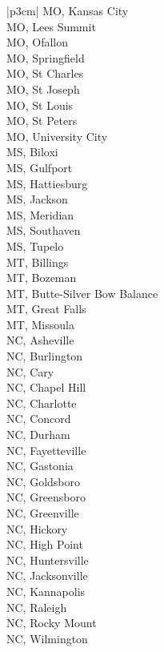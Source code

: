 \begin{customLongTable}{ |p{3cm}| }
MO, Kansas City \\ \hline
MO, Lees Summit \\ \hline
MO, Ofallon \\ \hline
MO, Springfield \\ \hline
MO, St Charles \\ \hline
MO, St Joseph \\ \hline
MO, St Louis \\ \hline
MO, St Peters \\ \hline
MO, University City \\ \hline
MS, Biloxi \\ \hline
MS, Gulfport \\ \hline
MS, Hattiesburg \\ \hline
MS, Jackson \\ \hline
MS, Meridian \\ \hline
MS, Southaven \\ \hline
MS, Tupelo \\ \hline
MT, Billings \\ \hline
MT, Bozeman \\ \hline
MT, Butte-Silver Bow Balance \\ \hline
MT, Great Falls \\ \hline
MT, Missoula \\ \hline
NC, Asheville \\ \hline
NC, Burlington \\ \hline
NC, Cary \\ \hline
NC, Chapel Hill \\ \hline
NC, Charlotte \\ \hline
NC, Concord \\ \hline
NC, Durham \\ \hline
NC, Fayetteville \\ \hline
NC, Gastonia \\ \hline
NC, Goldsboro \\ \hline
NC, Greensboro \\ \hline
NC, Greenville \\ \hline
NC, Hickory \\ \hline
NC, High Point \\ \hline
NC, Huntersville \\ \hline
NC, Jacksonville \\ \hline
NC, Kannapolis \\ \hline
NC, Raleigh \\ \hline
NC, Rocky Mount \\ \hline
NC, Wilmington \\ \hline

\end{customLongTable}
